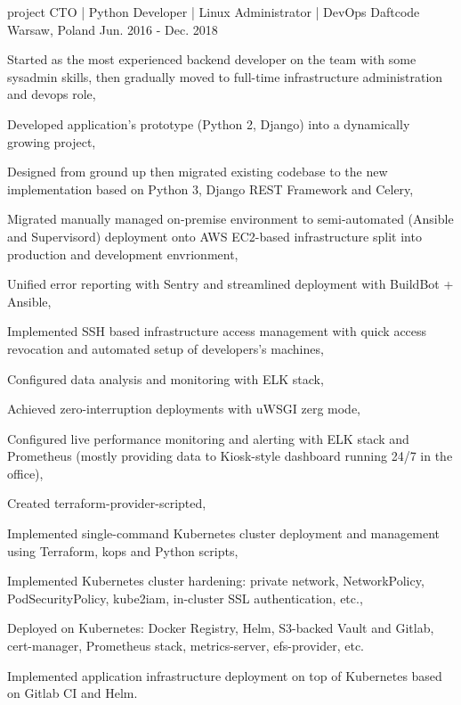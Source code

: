 \begin{cventries}
  \cventry
  {project CTO | Python Developer | Linux Administrator | DevOps} %
  {Daftcode} %
  {Warsaw, Poland} %
  {Jun. 2016 - Dec. 2018} %
  {
    \begin{cvitems} %
      \item {Started as the most experienced backend developer on the team with some sysadmin skills, then gradually moved to full-time infrastructure administration and devops role,}
      \item {Developed application's prototype (Python 2, Django) into a dynamically growing project,}
      \item {Designed from ground up then migrated existing codebase to the new implementation based on Python 3, Django REST Framework and Celery,}
      \item {Migrated manually managed on-premise environment to semi-automated (Ansible and Supervisord) deployment onto AWS EC2-based infrastructure split into production and development envrionment,}
      \item {Unified error reporting with Sentry and streamlined deployment with BuildBot + Ansible,}
      \item {Implemented SSH based infrastructure access management with quick access revocation and automated setup of developers's machines,}
      \item {Configured data analysis and monitoring with ELK stack,}
      \item {Achieved zero-interruption deployments with uWSGI zerg mode,}
      \item {Configured live performance monitoring and alerting with ELK stack and Prometheus (mostly providing data to Kiosk-style dashboard running 24/7 in the office),}
      \item {Created terraform-provider-scripted,}
      \item {Implemented single-command Kubernetes cluster deployment and management using Terraform, kops and Python scripts,}
      \item {Implemented Kubernetes cluster hardening: private network, NetworkPolicy, PodSecurityPolicy, kube2iam, in-cluster SSL authentication, etc.,}
      \item {Deployed on Kubernetes: Docker Registry, Helm, S3-backed Vault and Gitlab, cert-manager, Prometheus stack, metrics-server, efs-provider, etc.}
      \item {Implemented application infrastructure deployment on top of Kubernetes based on Gitlab CI and Helm.}
    \end{cvitems}
  }


\end{cventries}
